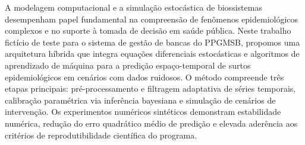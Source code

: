 \documentclass[diss]{classPPGMSB}   %
\begin{document}



%
\makeCapa

\makeContraCapa

\folhaAprovacao
\frontmatter
\begin{agradecimentos}
	\lipsum[1-2]
\end{agradecimentos}


\begin{dedicar}
	\lipsum[3][1-4]
\end{dedicar}


\begin{resumo}
	A modelagem computacional e a simulação estocástica de biossistemas desempenham papel fundamental na compreensão de fenômenos epidemiológicos complexos e no suporte à tomada de decisão em saúde pública. Neste trabalho fictício de teste para o sistema de gestão de bancas do PPGMSB, propomos uma arquitetura híbrida que integra equações diferenciais estocásticas e algoritmos de aprendizado de máquina para a predição espaço-temporal de surtos epidemiológicos em cenários com dados ruidosos. O método compreende três etapas principais: pré-processamento e filtragem adaptativa de séries temporais, calibração paramétrica via inferência bayesiana e simulação de cenários de intervenção. Os experimentos numéricos sintéticos demonstram estabilidade numérica, redução do erro quadrático médio de predição e elevada aderência aos critérios de reprodutibilidade científica do programa.
\end{resumo}
% 
\end{document}
